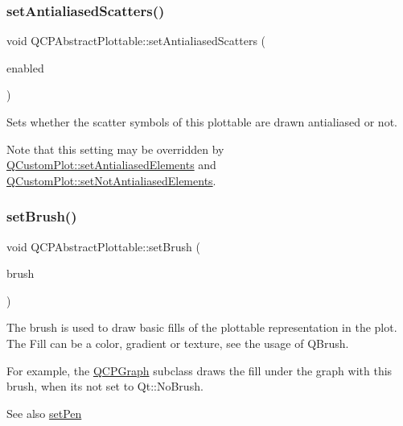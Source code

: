 \subsubsection{\texorpdfstring{set\+Antialiased\+Scatters()}{setAntialiasedScatters()}}
{\footnotesize\ttfamily void Q\+C\+P\+Abstract\+Plottable\+::set\+Antialiased\+Scatters (\begin{DoxyParamCaption}\item[{bool}]{enabled }\end{DoxyParamCaption})}

Sets whether the scatter symbols of this plottable are drawn antialiased or not.

Note that this setting may be overridden by \hyperlink{class_q_custom_plot_af6f91e5eab1be85f67c556e98c3745e8}{Q\+Custom\+Plot\+::set\+Antialiased\+Elements} and \hyperlink{class_q_custom_plot_ae10d685b5eabea2999fb8775ca173c24}{Q\+Custom\+Plot\+::set\+Not\+Antialiased\+Elements}. \mbox{\label{class_q_c_p_abstract_plottable_a7a4b92144dca6453a1f0f210e27edc74}} 
\subsubsection{\texorpdfstring{set\+Brush()}{setBrush()}}
{\footnotesize\ttfamily void Q\+C\+P\+Abstract\+Plottable\+::set\+Brush (\begin{DoxyParamCaption}\item[{const Q\+Brush \&}]{brush }\end{DoxyParamCaption})}

The brush is used to draw basic fills of the plottable representation in the plot. The Fill can be a color, gradient or texture, see the usage of Q\+Brush.

For example, the \hyperlink{class_q_c_p_graph}{Q\+C\+P\+Graph} subclass draws the fill under the graph with this brush, when it\textquotesingle{}s not set to Qt\+::\+No\+Brush.

\begin{DoxySeeAlso}{See also}
\hyperlink{class_q_c_p_abstract_plottable_ab74b09ae4c0e7e13142fe4b5bf46cac7}{set\+Pen} 
\end{DoxySeeAlso}
\mbox{\label{class_q_c_p_abstract_plottable_a8524fa2994c63c0913ebd9bb2ffa3920}} 
